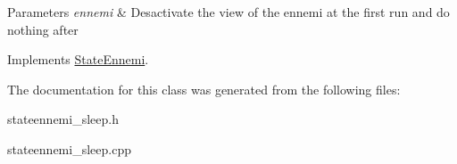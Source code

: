 \begin{DoxyParams}{Parameters}
{\em ennemi} & Desactivate the view of the ennemi at the first run and do nothing after \\
\hline
\end{DoxyParams}


Implements \hyperlink{class_state_ennemi_a8df87629876307ddb6cb241864bb8da8}{State\+Ennemi}.



The documentation for this class was generated from the following files\+:\begin{DoxyCompactItemize}
\item 
stateennemi\+\_\+sleep.\+h\item 
stateennemi\+\_\+sleep.\+cpp\end{DoxyCompactItemize}
